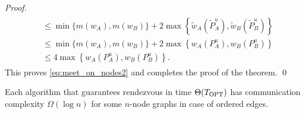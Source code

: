 \documentclass{llncs}
\newcommand{\Topts}{T_{\scriptsize \textup{OPT}}}
\begin{document}
\begin{proof}
\begin{gather*}
\begin{align}
& \leq \min\{m(w_A),m(w_B)\} + 2\max\left\{\widetilde{w}_{A}(\widetilde{P}_A^{u}),\widetilde{w}_{B}(\widetilde{P}_B^{u})\right\} \nonumber \\
& \leq \min\{m(w_A),m(w_B)\} + 2\max\left\{w_A(P_A^{u}),w_B(P_B^{u})\right\} \nonumber \\
& \leq 4\max\left\{ w_A(P_A^u),w_B(P_B^u) \right\}. \nonumber
\end{align}
\end{gather*}
This proves \eqref{eq:meet_on_nodes2} and completes the proof of the theorem.
\qed\end{proof}

\begin{theorem} \label{thm:case2+comm+lower}
Each algorithm that guarantees rendezvous in time $\Theta(\Topts)$ has communication complexity $\Omega(\log n)$ for some $n$-node graphs in case of ordered edges.
\end{theorem}
\end{document}
